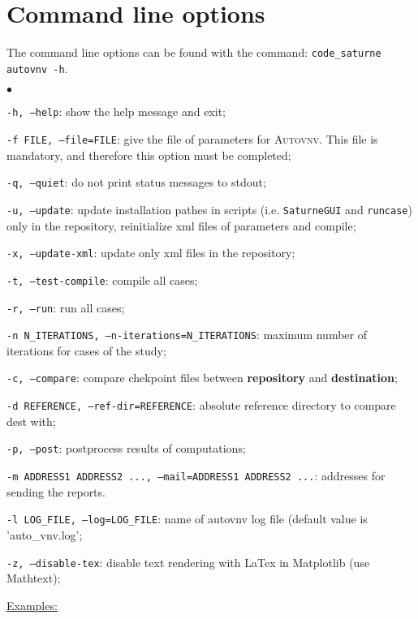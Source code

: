 \documentclass[a4paper,10pt,twoside]{csshortdoc}
\begin{document}
\section{Command line options}

The command line options can be found with the command: \texttt{code\_saturne
autovnv -h}.

\begin{list}{$\bullet$}{}
\item \texttt{-h, --help}: show the help message and exit;
\item \texttt{-f FILE, --file=FILE}: give the file of parameters for
\textsc{Autovnv}. This file is mandatory, and therefore this option must be
completed;
\item \texttt{-q, --quiet}: do not print status messages to stdout;
\item \texttt{-u, --update}: update installation pathes in scripts (i.e. \texttt{SaturneGUI} and
  \texttt{runcase}) only in the repository, reinitialize xml files of parameters and compile;
\item \texttt{-x, --update-xml}: update only xml files in the repository;
\item \texttt{-t, --test-compile}: compile all cases;
\item \texttt{-r, --run}: run all cases;
\item \texttt{-n N\_ITERATIONS, --n-iterations=N\_ITERATIONS}: maximum number of iterations for cases of the study;
\item \texttt{-c, --compare}: compare chekpoint files between
  \textbf{repository} and \textbf{destination};
\item \texttt{-d REFERENCE, --ref-dir=REFERENCE}: absolute reference directory to compare dest with;
\item \texttt{-p, --post}: postprocess results of computations;
\item \texttt{-m ADDRESS1 ADDRESS2 ..., --mail=ADDRESS1 ADDRESS2 ...}: addresses
  for sending the reports.
\item \texttt{-l LOG\_FILE, --log=LOG\_FILE}: name of autovnv log file (default value is 'auto\_vnv.log';
\item \texttt{-z, --disable-tex}: disable text rendering with LaTex in Matplotlib (use Mathtext);
\end{list}

\underline{Examples:}
\end{document}

